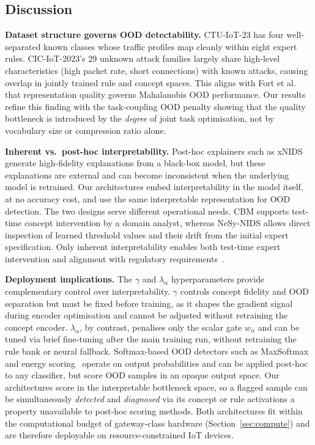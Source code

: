\documentclass[journal]{IEEEtran}
\begin{document}
\subsection{Discussion}

\textbf{Dataset structure governs OOD detectability.}
CTU-IoT-23 has four well-separated known classes whose traffic profiles
map cleanly within eight expert rules. CIC-IoT-2023's 29 unknown attack
families largely share high-level characteristics (high packet rate,
short connections) with known attacks, causing overlap in jointly
trained rule and concept spaces. This aligns with Fort
et al.~\cite{fort2021exploring} that representation quality governs
Mahalanobis OOD performance. Our results refine this finding with the
task-coupling OOD penalty showing that the quality bottleneck is introduced
by the \emph{degree} of joint task optimisation, not by vocabulary size
or compression ratio alone.

\textbf{Inherent vs.\ post-hoc interpretability.}
Post-hoc explainers such as xNIDS~\cite{wei2023xnids} generate high-fidelity
explanations from a black-box model, but these explanations are external
and can become inconsistent when the underlying model is retrained. Our
architectures embed interpretability in the model itself, at no accuracy cost,
and use the same interpretable representation for OOD detection.
The two designs serve different operational needs. CBM supports test-time
concept intervention by a domain analyst, whereas NeSy-NIDS allows direct
inspection of learned threshold values and their drift from the initial
expert specification. Only inherent interpretability enables both test-time
expert intervention and alignment with regulatory
requirements~\cite{arp2022dos,rudin2019stop}.

\textbf{Deployment implications.}
The $\gamma$ and $\lambda_\alpha$ hyperparameters provide complementary
control over interpretability. $\gamma$ controls concept fidelity and OOD
separation but must be fixed before training, as it shapes the gradient
signal during encoder optimisation and cannot be adjusted without
retraining the concept encoder. $\lambda_\alpha$, by contrast, penalises
only the scalar gate $w_\alpha$ and can be tuned via brief fine-tuning
after the main training run, without retraining the rule bank or neural
fallback. Softmax-based OOD detectors such as
MaxSoftmax~\cite{hendrycks2017baseline} and energy
scoring~\cite{liu2020energy} operate on output probabilities and can be
applied post-hoc to any classifier, but score OOD samples in an opaque
output space. Our architectures score in the interpretable bottleneck
space, so a flagged sample can be simultaneously \emph{detected} and
\emph{diagnosed} via its concept or rule activations a property
unavailable to post-hoc scoring methods. Both architectures fit within the computational budget of gateway-class
hardware (Section~\ref{sec:compute}) and are therefore deployable on
resource-constrained IoT devices.
\end{document}

